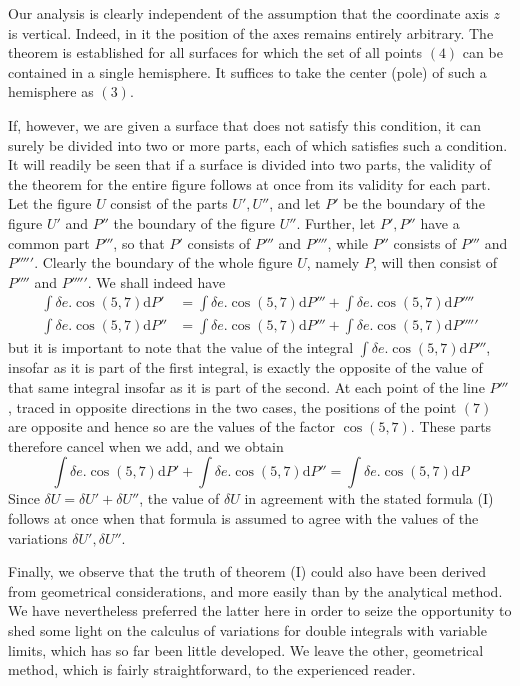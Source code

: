 Our analysis is clearly independent of the assumption that the coordinate axis $z$ is vertical. Indeed, in it the position of the axes remains entirely arbitrary. The theorem is established for all surfaces for which the set of all points $(4)$ can be contained in a single hemisphere. It suffices to take the center (pole) of such a hemisphere as $(3)$.

If, however, we are given a surface that does not satisfy this condition, it can surely be divided into two or more parts, each of which satisfies such a condition. It will readily be seen that if a surface is divided into two parts, the validity of the theorem for the entire figure follows at once from its validity for each part. Let the figure $U$ consist of the parts $U',U''$, and let $P'$ be the boundary of the figure $U'$ and $P''$ the boundary of the figure $U''$. Further, let $P',P''$ have a common part $P'''$, so that $P'$ consists of $P'''$ and $P''''$, while $P''$ consists of $P'''$ and $P'''''$. Clearly the boundary of the whole figure $U$, namely $P$, will then consist of $P''''$ and $P'''''$. We shall indeed have
\[
\begin{aligned}
\int\delta e.\cos(5,7)\mathrm{d}P'&=\int\delta e.\cos(5,7)\mathrm{d}P'''+\int\delta e.\cos(5,7)\mathrm{d}P''''\\
\int\delta e.\cos(5,7)\mathrm{d}P''&=\int\delta e.\cos(5,7)\mathrm{d}P'''+\int\delta e.\cos(5,7)\mathrm{d}P'''''
\end{aligned}
\]
but it is important to note that the value of the integral $\int\delta e.\cos(5,7)\mathrm{d}P'''$, insofar as it is part of the first integral, is exactly the opposite of the value of that same integral insofar as it is part of the second. At each point of the line $P'''$, traced in opposite directions in the two cases, the positions of the point $(7)$ are opposite and hence so are the values of the factor $\cos(5,7)$. These parts therefore cancel when we add, and we obtain
\[
\int\delta e.\cos(5,7)\mathrm{d}P'+\int\delta e.\cos(5,7)\mathrm{d}P''=\int\delta e.\cos(5,7)\mathrm{d}P
\]
Since $\delta U=\delta U'+\delta U''$, the value of $\delta U$ in agreement with the stated formula (I) follows at once when that formula is assumed to agree with the values of the variations $\delta U',\delta U''$.

Finally, we observe that the truth of theorem (I) could also have been derived from geometrical considerations, and more easily than by the analytical method. We have nevertheless preferred the latter here in order to seize the opportunity to shed some light on the calculus of variations for double integrals with variable limits, which has so far been little developed. We leave the other, geometrical method, which is fairly straightforward, to the experienced reader.

